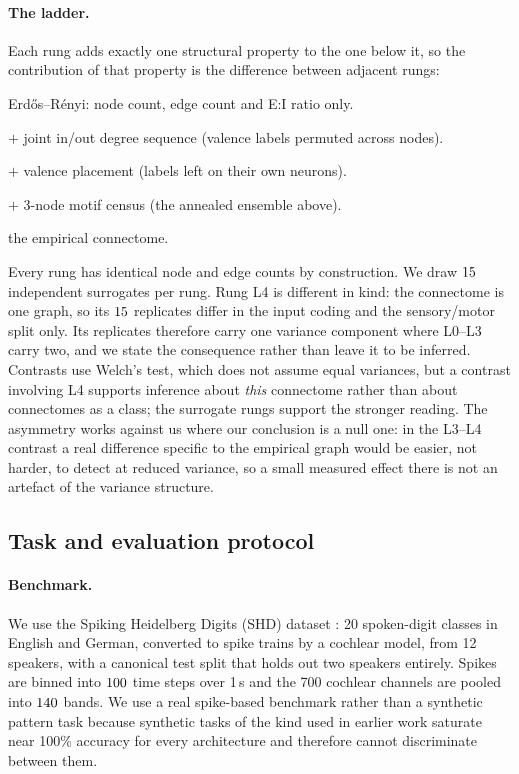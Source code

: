 \paragraph{The ladder.}
Each rung adds exactly one structural property to the one below it, so the
contribution of that property is the difference between adjacent rungs:
\begin{description}[leftmargin=1.1em,itemsep=1pt]
  \item[L0] Erd\H{o}s--R\'enyi: node count, edge count and E:I ratio only.
  \item[L1] $+$ joint in/out degree sequence (valence labels permuted across nodes).
  \item[L2] $+$ valence placement (labels left on their own neurons).
  \item[L3] $+$ 3-node motif census (the annealed ensemble above).
  \item[L4] the empirical connectome.
\end{description}
Every rung has identical node and edge counts by construction. We draw
$15$ independent surrogates per rung. Rung L4 is different in kind: the
connectome is one graph, so its $15$ replicates differ in the input
coding and the sensory/motor split only. Its replicates therefore carry one variance
component where L0--L3 carry two, and we state the consequence rather than leave it to
be inferred. Contrasts use Welch's test, which does not assume equal variances, but a
contrast involving L4 supports inference about \emph{this} connectome rather than about
connectomes as a class; the surrogate rungs support the stronger reading. The asymmetry
works against us where our conclusion is a null one: in the L3--L4 contrast a real
difference specific to the empirical graph would be easier, not harder, to detect at
reduced variance, so a small measured effect there is not an artefact of the variance
structure.

\subsection{Task and evaluation protocol}
\label{sec:task}

\paragraph{Benchmark.}
We use the Spiking Heidelberg Digits (SHD) dataset \cite{cramer2022heidelberg}:
20 spoken-digit classes in English and German, converted to spike trains by a
cochlear model, from 12 speakers, with a canonical test split that holds out two
speakers entirely. Spikes are binned into $100$ time steps over 1\,s and the 700
cochlear channels are pooled into $140$ bands. We use a real spike-based
benchmark rather than a synthetic pattern task because synthetic tasks of the kind
used in earlier work saturate near 100\% accuracy for every architecture and
therefore cannot discriminate between them.

